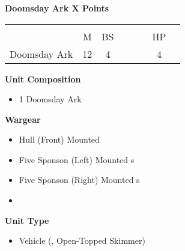 \newpage
\subsubsection[Doomsday Ark]{}
\hspace{0.5em}
\begin{minipage}[t]{0.72\textwidth}
	{\large \textbf{Doomsday Ark \dotfill X Points}}
	\begin{NiceTabular}{m{145 pt} *{2}{c} | *{3}{c} | c | c }
		& & &  & & & &  \\
		& M & BS &  &  &  & HP &  \\
		\hline
		Doomsday Ark & 12 & 4 &  &  &  & 4 & \\
	\end{NiceTabular}
	\small
	\begin{minipage}[t]{0.5\textwidth}
		\begin{flushleft}
			\vspace*{2em}
			\textbf{Unit Composition}
			\begin{itemize}
				\item 1 Doomsday Ark
			\end{itemize}
			
			\textbf{Wargear}
			\begin{itemize}
				\item Hull (Front) Mounted 
				\item Five Sponson (Left) Mounted s
				\item Five Sponson (Right) Mounted s
				\item {}
			\end{itemize}
		\end{flushleft}
	\end{minipage}
	\begin{minipage}[t]{0.5\textwidth}
		\begin{flushleft}
			\vspace*{2em}
			\textbf{Unit Type}
			\begin{itemize}
				\item Vehicle (, Open-Topped Skimmer)
			\end{itemize}
			

\end{flushleft}
\end{minipage}
\end{minipage}
